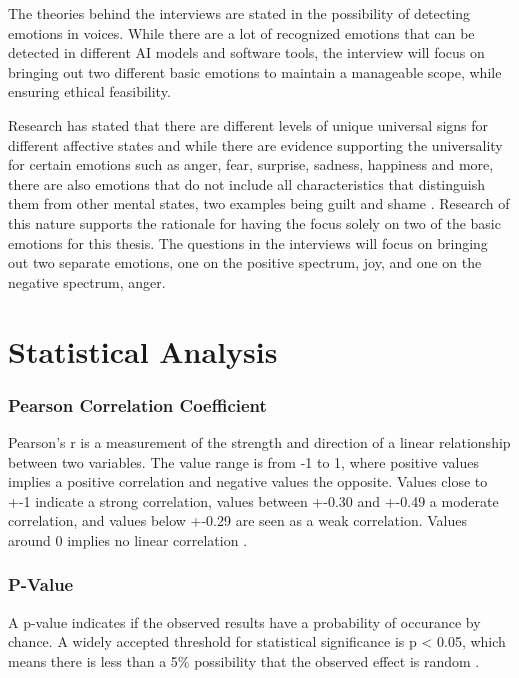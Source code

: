 The theories behind the interviews are stated in the possibility of detecting emotions in voices. While there are a lot of recognized emotions that can be detected in different AI models and software tools, the interview will focus on bringing out two different basic emotions to maintain a manageable scope, while ensuring ethical feasibility.

Research has stated that there are different levels of unique universal signs for different affective states and while there are evidence supporting the universality for certain emotions such as anger, fear, surprise, sadness, happiness and more, there are also emotions that do not include all characteristics that distinguish them from other mental states, two examples being guilt and shame \autocite{Ekman2011}. Research of this nature supports the rationale for having the focus solely on two of the basic emotions for this thesis. The questions in the interviews will focus on bringing out two separate emotions, one on the positive spectrum, joy, and one on the negative spectrum, anger.



\section{Statistical Analysis}
\label{sec:theo-stat-analyse}

\subsubsection{Pearson Correlation Coefficient}
Pearson's r is a measurement of the strength and direction of a linear relationship between two variables. The value range is from -1 to 1, where positive values implies a positive correlation and negative values the opposite.
Values close to +-1 indicate a strong correlation, values between +-0.30 and +-0.49 a moderate correlation, and values 
below +-0.29 are seen as a weak correlation. Values around 0 implies no linear correlation \autocite{Bruce2017}.

\subsubsection{P-Value}
A p-value indicates if the observed results have a probability of occurance by chance. A widely accepted threshold for statistical significance 
is p < 0.05, which means there is less than a 5\% possibility that the observed effect is random \autocite{Bruce2017}. 

